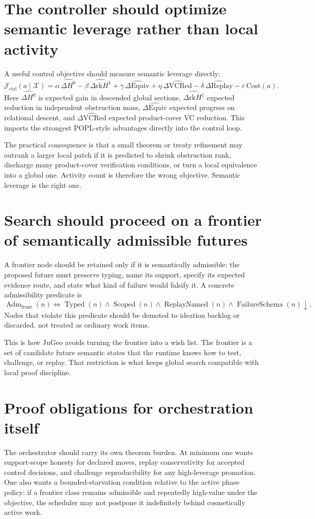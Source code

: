 \documentclass[11pt]{report}
\begin{document}
\section{The controller should optimize semantic leverage rather than local activity}
A useful control objective should measure semantic leverage directly:
\[
\mathcal{J}_{\mathrm{ctrl}}(a \mid \mathcal{X}) =
\alpha\,\widehat{\Delta H^0}
-\beta\,\widehat{\Delta \mathrm{rk}H^1}
+\gamma\,\widehat{\Delta \mathrm{Equiv}}
+\eta\,\widehat{\Delta \mathrm{VCRed}}
-\delta\,\widehat{\Delta \mathrm{Replay}}
-\varepsilon\,\mathrm{Cost}(a).
\]
Here $\widehat{\Delta H^0}$ is expected gain in descended global sections, $\widehat{\Delta \mathrm{rk}H^1}$ expected reduction in independent obstruction mass, $\widehat{\Delta \mathrm{Equiv}}$ expected progress on relational descent, and $\widehat{\Delta \mathrm{VCRed}}$ expected product-cover VC reduction. This imports the strongest POPL-style advantages directly into the control loop.

The practical consequence is that a small theorem or treaty refinement may outrank a larger local patch if it is predicted to shrink obstruction rank, discharge many product-cover verification conditions, or turn a local equivalence into a global one. Activity count is therefore the wrong objective. Semantic leverage is the right one.

\section{Search should proceed on a frontier of semantically admissible futures}
A frontier node should be retained only if it is semantically admissible: the proposed future must preserve typing, name its support, specify its expected evidence route, and state what kind of failure would falsify it. A concrete admissibility predicate is
\[
\operatorname{Adm}_{\mathrm{front}}(n)
\iff
\operatorname{Typed}(n)
\land
\operatorname{Scoped}(n)
\land
\operatorname{ReplayNamed}(n)
\land
\operatorname{FailureSchema}(n)\downarrow.
\]
Nodes that violate this predicate should be demoted to ideation backlog or discarded, not treated as ordinary work items.

This is how JuGeo avoids turning the frontier into a wish list. The frontier is a set of candidate future semantic states that the runtime knows how to test, challenge, or replay. That restriction is what keeps global search compatible with local proof discipline.

\section{Proof obligations for orchestration itself}
The orchestrator should carry its own theorem burden. At minimum one wants support-scope honesty for declared moves, replay conservativity for accepted control decisions, and challenge reproducibility for any high-leverage promotion. One also wants a bounded-starvation condition relative to the active phase policy: if a frontier class remains admissible and repeatedly high-value under the objective, the scheduler may not postpone it indefinitely behind cosmetically active work.
\end{document}
